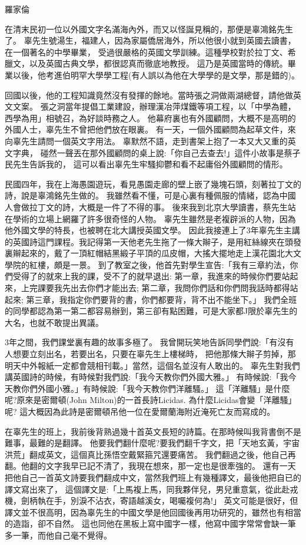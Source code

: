 羅家倫

在清末民初一位以外國文字名滿海內外，而又以怪誕見稱的，那便是辜鴻銘先生了。
辜先生號湯生，福建人，因為家屬僑居海外，所以他很小就到英國去讀書，在一個著名的中學畢業，
受過很嚴格的英國文學訓練。這種學校對於拉丁文、希臘文，以及英國古典文學，都很認真而徹底地教授。
這乃是英國當時的傳統。畢業以後，他考進伯明罕大學學工程(有人誤以為他在大學學的是文學，那是錯的)。

回國以後，他的工程知識竟然沒有發揮的餘地。當時張之洞做兩湖總督，請他做英文文案。
張之洞當年提倡工業建設，辦理漢冶萍煤鐵等項工程，以「中學為體，西學為用」相號召，為好談時務之人。
他幕府裏也有外國顧問，大概不是高明的外國人士，辜先生不曾把他們放在眼裏。
有一天，一個外國顧問為起草文件，來向辜先生請問一個英文字用法。
辜默然不語，走到書架上抱了一本又大又重的英文字典，
碰然一聲丟在那外國顧問的桌上說:「你自己去查去!」這件小故事是蔡孑民先生告訴我的，
這可以看出辜先生牢騷抑鬱和看不起庸俗外國顧問的情形。

民國四年，我在上海愚園遊玩，看見愚園走廊的壁上嵌了幾塊石頭，刻著拉丁文的詩，說是辜鴻銘先生做的。
我雖然看不懂，可是心裏有種佩服的情緒，認為中國人會做拉丁文的詩，大概是一件了不得的事。
後來我到北京大學讀書，蔡先生站在學術的立場上網羅了許多很奇怪的人物。
辜先生雖然是老複辟派的人物，因為他外國文學的特長，也被聘在北大講授英國文學。
因此我接連上了3年辜先生主講的英國詩這門課程。我記得第一天他老先生拖了一條大辮子，是用紅絲線夾在頭發裏辮起來的，戴了一頂紅帽結黑緞子平頂的瓜皮帽，大搖大擺地走上漢花園北大文學院的紅樓，頗是一景。
到了教室之後，他首先對學生宣告:「我有三章約法，你們受得了的就來上我的課，受不了的就早退出:
第一章，我進來的時候你們要站起來，上完課要我先出去你們才能出去;
第二章，我問你們話和你們問我話時都得站起來;
第三章，我指定你們要背的書，你們都要背，背不出不能坐下。」
我們全班的同學都認為第一第二都容易辦到，第三卻有點困難，可是大家都J限於辜先生的大名，也就不敢提出異議。

3年之間，我們課堂裏有趣的故事多極了。
我曾開玩笑地告訴同學們說:「有沒有人想要立刻出名，若要出名，只要在辜先生上樓梯時，
把他那條大辮子剪掉，那明天中外報紙一定都會競相刊載。」當然，這個名並沒有人敢出的。
辜先生對我們講英國詩的時候，有時候對我們說:「我今天教你們外國大雅。」
有時候說:「我今天教你們外國小雅。」有時候說:「我今天教你們洋離騷。」
這「洋離騷」是什麼呢?原來是密爾頓(John Milton)的一首長詩Licidas.
為什麼Licidas會變「洋離騷」呢?
這大概因為此詩是密爾頓吊他一位在愛爾蘭海附近淹死亡友而寫成的。

在辜先生的班上，我前後背熟過幾十首英文長短的詩篇。在那時候叫我背書倒不是難事，最難的是翻譯。
他要我們翻什麼呢?要我們翻千字文，把「天地玄黃，宇宙洪荒」翻成英文，這個真比孫悟空戴緊箍咒還要痛苦。
我們翻過之後，他自己再翻。他翻的文字我早已記不清了，我現在想來，那一定也是很牽強的。
還有一天把他自己一首英文詩要我們翻成中文，當然我們班上有幾種譯文，最後他把自已的譯文寫出來了，
這個譯文是:「上馬複上馬，同我夥伴兒，男兒重意氣，從此赴戎機，劍柄執在手，別淚不沾衣，寄語越溪女，喝囑複何為!」
英文可能是很好，但譯文並不很高明，因為辜先生的中國文學是他回國後再用功研究的，雖然也有相當的造詣，卻不自然。
這也同他在黑板上寫中國字一樣，他寫中國字常常會缺一筆多一筆，而他自己毫不覺得。

